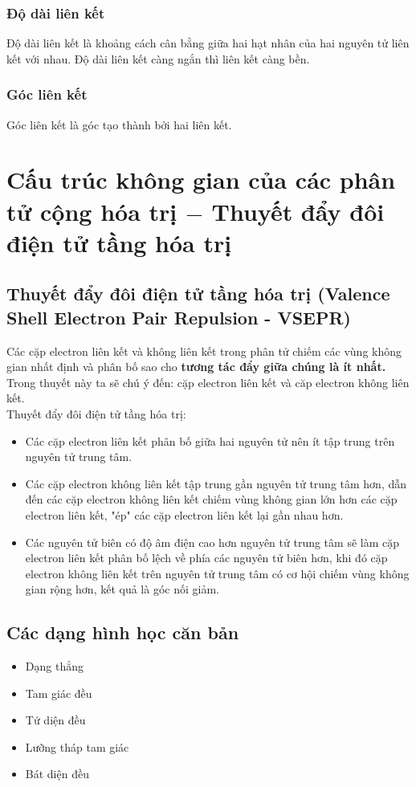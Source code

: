 \subsubsection{Độ dài liên kết}
Độ dài liên kết là khoảng cách cân bằng giữa hai hạt nhân của hai nguyên tử liên kết với nhau. Độ dài liên kết càng ngắn thì liên kết càng bền.
\subsubsection{Góc liên kết}
Góc liên kết là góc tạo thành bởi hai liên kết. 
\section{Cấu trúc không gian của các phân tử cộng hóa trị $-$ Thuyết đẩy đôi điện tử tầng hóa trị}
\subsection{Thuyết đẩy đôi điện tử tầng hóa trị (Valence Shell Electron Pair Repulsion - VSEPR)}
Các cặp electron liên kết và không liên kết trong phân tử chiếm các vùng không gian nhất định và phân bố sao cho \textbf{tương tác đẩy giữa chúng là ít nhất.}\\
Trong thuyết này ta sẽ chú ý đến: cặp electron liên kết và căp electron không liên kết.\\
Thuyết đẩy đôi điện tử tầng hóa trị:
\begin{itemize}
\item Các cặp electron liên kết phân bố giữa hai nguyên tử nên ít tập trung trên nguyên tử trung tâm.
\item Các cặp electron không liên kết tập trung gần nguyên tử trung tâm hơn, dẫn đến các cặp electron không liên kết chiếm vùng không gian lớn hơn các cặp electron liên kết, "ép" các cặp electron liên kết lại gần nhau hơn.
\item Các nguyên tử biên có độ âm điện cao hơn nguyên tử trung tâm sẽ làm cặp electron liên kết phân bố lệch về phía các nguyên tử biên hơn, khi đó cặp electron không liên kết trên nguyên tử trung tâm có cơ hội chiếm vùng không gian rộng hơn, kết quả là góc nối giảm.
\end{itemize}
\subsection{Các dạng hình học căn bản}
\begin{itemize}
\item Dạng thẳng
\item Tam giác đều
\item Tứ diện đều
\item Lưỡng tháp tam giác
\item Bát diện đều
\end{itemize}
